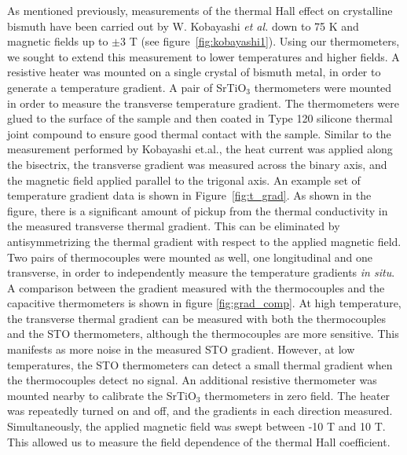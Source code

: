 \documentclass{thesis-umich}
\begin{document}
As mentioned previously, measurements of the thermal Hall effect on crystalline bismuth have been carried out by W.
Kobayashi \textit{et al.}\cite{Kobayashi2012} down to 75 K and magnetic fields up
to $\pm$3 T (see figure~\ref{fig:kobayashi1}). Using our thermometers, we sought to extend this measurement to
lower temperatures and higher fields. A resistive heater was mounted on a single
crystal of bismuth metal, in order to generate a temperature gradient. A pair of
SrTiO$_3$ thermometers were mounted in order to measure the transverse
temperature gradient. The thermometers were glued to the surface of the sample
and then coated in Type 120 silicone thermal joint compound to ensure good
thermal contact with the sample. Similar to the measurement performed by Kobayashi et.al., the heat current was applied along the bisectrix, the transverse gradient was measured across the binary axis, and the magnetic field applied parallel to the trigonal axis. An example set of temperature gradient data is
shown in Figure~\ref{fig:t_grad}. As shown in the figure, there is a significant amount of pickup from the thermal conductivity in the measured transverse thermal gradient. This can be eliminated by antisymmetrizing the thermal gradient with respect to the applied magnetic field. Two pairs of thermocouples were mounted as well,
one longitudinal and one transverse, in order to independently measure the
temperature gradients \textit{in situ}. A comparison between the gradient measured with the thermocouples and the capacitive thermometers is shown in figure \ref{fig:grad_comp}. At high temperature, the transverse thermal gradient can be measured with both the thermocouples and the STO thermometers, although the thermocouples are more sensitive. This manifests as more noise in the measured STO gradient. However, at low temperatures, the STO thermometers can detect a small thermal gradient when the thermocouples detect no signal. An additional resistive thermometer was
mounted nearby to calibrate the SrTiO$_3$ thermometers in zero field.  The
heater was repeatedly turned on and off, and the gradients in each direction
measured. Simultaneously, the applied magnetic field was swept between -10 T and
10 T. This allowed us to measure the field dependence of the thermal Hall
coefficient.
\end{document}
